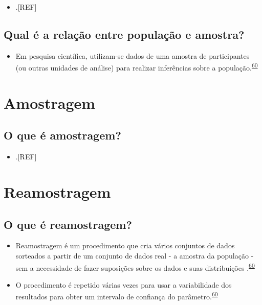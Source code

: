 \documentclass[
]{book}
\providecommand{\tightlist}{%
  \setlength{\itemsep}{0pt}\setlength{\parskip}{0pt}}
\begin{document}
\begin{itemize}
\tightlist
\item
  .{[}REF{]}
\end{itemize}

\hypertarget{qual-uxe9-a-relauxe7uxe3o-entre-populauxe7uxe3o-e-amostra}{%
\subsection{Qual é a relação entre população e amostra?}\label{qual-uxe9-a-relauxe7uxe3o-entre-populauxe7uxe3o-e-amostra}}

\begin{itemize}
\tightlist
\item
  Em pesquisa científica, utilizam-se dados de uma amostra de participantes (ou outras unidades de análise) para realizar inferências sobre a população.\textsuperscript{\protect\hyperlink{ref-Bland2015}{60}}
\end{itemize}

\hypertarget{amostragem}{%
\section{Amostragem}\label{amostragem}}

\hypertarget{o-que-uxe9-amostragem}{%
\subsection{O que é amostragem?}\label{o-que-uxe9-amostragem}}

\begin{itemize}
\tightlist
\item
  .{[}REF{]}
\end{itemize}

\hypertarget{reamostragem}{%
\section{Reamostragem}\label{reamostragem}}

\hypertarget{o-que-uxe9-reamostragem}{%
\subsection{O que é reamostragem?}\label{o-que-uxe9-reamostragem}}

\begin{itemize}
\item
  Reamostragem é um procedimento que cria vários conjuntos de dados sorteados a partir de um conjunto de dados real - a amostra da população - sem a necessidade de fazer suposições sobre os dados e suas distribuições .\textsuperscript{\protect\hyperlink{ref-Bland2015}{60}}
\item
  O procedimento é repetido várias vezes para usar a variabilidade dos resultados para obter um intervalo de confiança do parâmetro.\textsuperscript{\protect\hyperlink{ref-Bland2015}{60}}
\end{itemize}
\end{document}
